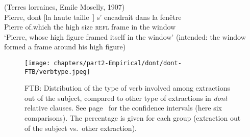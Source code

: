 \ex (Terres lorraines, Emile Moselly, 1907)\\
\gll Pierre, dont [la haute taille~\trace{}] s' encadrait dans la fenêtre\\
Pierre of.which the high size \textsc{refl} frame in the window\\
\glt `Pierre, whose high figure framed itself in the window' (intended: the window formed a frame around his high figure)
\label{ex:d1900-subj-medio}
\zl 

\begin{figure}
    \texttt{[image: chapters/part2-Empirical/dont/dont-FTB/verbtype.jpeg]}
    \caption[Distribution on the French Treebank of verb types involved among extractions out of the subject, compared to other extraction types in \emph{dont} relative clauses]{FTB: Distribution of the type of verb involved among extractions out of the subject, compared to other type of extractions in \emph{dont} relative clauses. See page~\pageref{ch:conf-intervals-binomial} for the confidence intervals (here six comparisons). The percentage is given for each group (extraction out of the subject vs.\ other extraction).}
    \label{fig:dont-FTB-verbtype}
\end{figure}
    
